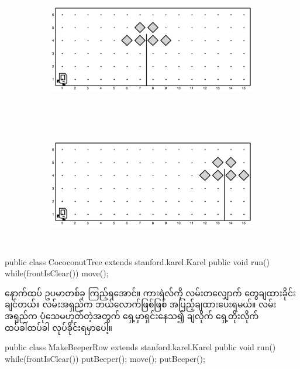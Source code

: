 \begin{sloppypar}
\begin{figure}[tbh!]
    \caption{}
    \begin{subfigure}[t]{0.46\textwidth}
        \includegraphics[height=2.2in, left]{ch02/CoconutTree/a.jpg}
        \caption{}
        \label{subfig:CoCoconutTreeA}
    \end{subfigure}

    \begin{subfigure}[t]{0.46\textwidth}
        \includegraphics[height=2.2in, left]{ch02/CoconutTree/b.jpg}
        \caption{}
    \end{subfigure}
\end{figure}

\begin{lstcodesimple}[float, caption={\mycodelstcpt{CococonutTree.java} \myenlstcpt{A}}, label={lst:CococonutTree}]
public class CococonutTree extends stanford.karel.Karel{
    public void run(){
            while(frontIsClear()){
                    move();
            }
    }
}
\end{lstcodesimple}

နောက်ထပ် ဥပမာတစ်ခု ကြည့်ရအောင်။ ကားရဲလ်ကို လမ်းတလျှောက် \mmbeeper  တွေချထားခိုင်းချင်တယ်။ လမ်းအရှည်က ဘယ်လောက်ဖြစ်ဖြစ် အပြည့်ချထားပေးရမယ်။ လမ်းအရှည်က ပုံသေမဟုတ်တဲ့အတွက် ရှေ့မှာရှင်းနေသ၍ \mmbeeper ချလိုက် ရှေ့တိုးလိုက် ထပ်ခါထပ်ခါ လုပ်ခိုင်းရမှာပေါ့။ 

\begin{lstcodesimple}[float, caption={\mycodelstcpt{MakeBeeperRow.java} \myenlstcpt{A}}, label={lst:MakeBeeperRow}]
public class MakeBeeperRow extends stanford.karel.Karel{
    public void run(){
            while(frontIsClear()){
                    putBeeper();
                    move();
            }
            putBeeper();
    }
}
\end{lstcodesimple}


\end{sloppypar}
